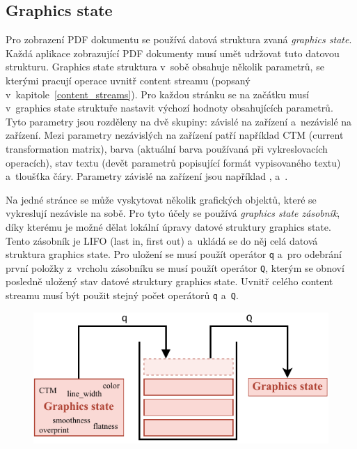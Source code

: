 \subsection*{Graphics state} \label{graphics_state}
Pro zobrazení PDF dokumentu se používá datová struktura zvaná \emph{graphics state}.
Každá aplikace zobrazující PDF dokumenty musí umět udržovat tuto datovou strukturu.
Graphics state struktura v~sobě obsahuje několik parametrů, se kterými pracují
operace uvnitř content streamu (popsaný v~kapitole~\ref{content_streams}). Pro
každou stránku se na začátku musí v~graphics state struktuře nastavit výchozí
hodnoty obsahujících parametrů. Tyto parametry jsou rozděleny na dvě skupiny:
závislé na zařízení a~nezávislé na zařízení. Mezi parametry nezávislých na zařízení
patří například CTM (current transformation matrix), barva (aktuální barva
používaná při vykreslovacích operacích), stav textu (devět parametrů popisující
formát vypisovaného textu) a~tloušťka čáry. Parametry závislé na zařízení jsou
například ,  a~.

Na jedné stránce se může vyskytovat několik grafických objektů, které se
vykreslují nezávisle na sobě. Pro tyto účely se používá
\emph{graphics state zásobník}, díky kterému je možné dělat lokální úpravy 
datové struktury graphics state. Tento zásobník je LIFO (last in, first out)
a~ukládá se do něj celá datová struktura graphics state. Pro uložení
se musí použít operátor \texttt{q} a~pro odebrání první položky z~vrcholu
zásobníku se musí použít operátor \texttt{Q}, kterým se obnoví posledně uložený
stav datové struktury graphics state. Uvnitř celého content streamu musí být
použit stejný počet operátorů \texttt{q} a~\texttt{Q}.

\begin{figure}[H]
    \centering
    \includegraphics[width=0.7\linewidth]{obrazky-figures/graphics_state_stack.pdf}
    \caption{}
    \label{pic_graphics_state}
\end{figure}

